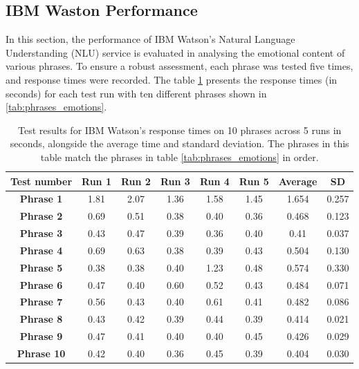 \subsection{IBM Waston Performance}

In this section, the performance of IBM Watson's Natural Language Understanding (NLU) service is evaluated in analysing the emotional content of various phrases. To ensure a robust assessment, each phrase was tested five times, and response times were recorded. The table \ref{tab:phrase_tests} presents the response times (in seconds) for each test run with ten different phrases shown in \ref{tab:phrases_emotions}.

\begin{table}[h!]
\centering{}
\caption{Test results for IBM Watson's response times on 10 phrases across 5 runs in seconds, alongside the average time and standard deviation. The phrases in this table match the phrases in table \ref{tab:phrases_emotions} in order.}
\begin{tabular}{|c|c|c|c|c|c|c|c|}
\hline
\textbf{Test number} & \textbf{Run 1} & \textbf{Run 2} & \textbf{Run 3} & \textbf{Run 4} & \textbf{Run 5} & \textbf{Average} & \textbf{SD} \\ \hline
\textbf{Phrase 1}    & 1.81 & 2.07 & 1.36 & 1.58 & 1.45 & 1.654 & 0.257        \\ \hline
\textbf{Phrase 2}    & 0.69 & 0.51 & 0.38 & 0.40 & 0.36 & 0.468 & 0.123        \\ \hline
\textbf{Phrase 3}    & 0.43 & 0.47 & 0.39 & 0.36 & 0.40 & 0.41  & 0.037        \\ \hline
\textbf{Phrase 4}    & 0.69 & 0.63 & 0.38 & 0.39 & 0.43 & 0.504 & 0.130        \\ \hline
\textbf{Phrase 5}    & 0.38 & 0.38 & 0.40 & 1.23 & 0.48 & 0.574 & 0.330        \\ \hline
\textbf{Phrase 6}    & 0.47 & 0.40 & 0.60 & 0.52 & 0.43 & 0.484 & 0.071        \\ \hline
\textbf{Phrase 7}    & 0.56 & 0.43 & 0.40 & 0.61 & 0.41 & 0.482 & 0.086        \\ \hline
\textbf{Phrase 8}    & 0.43 & 0.42 & 0.39 & 0.44 & 0.39 & 0.414 & 0.021        \\ \hline
\textbf{Phrase 9}    & 0.47 & 0.41 & 0.40 & 0.40 & 0.45 & 0.426 & 0.029        \\ \hline
\textbf{Phrase 10}   & 0.42 & 0.40 & 0.36 & 0.45 & 0.39 & 0.404 & 0.030        \\ \hline
\end{tabular}
\label{tab:phrase_tests}
\end{table}

